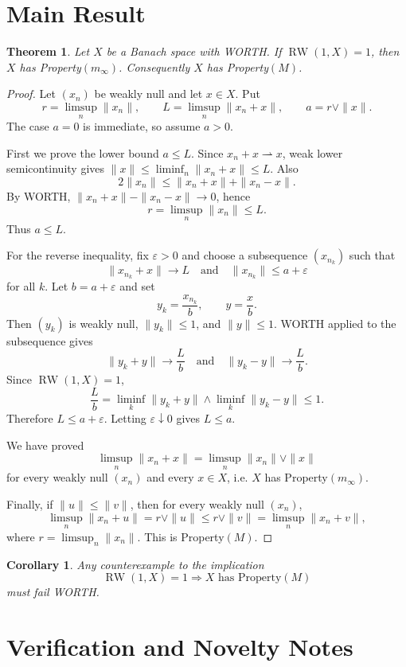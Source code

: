 \documentclass[11pt]{article}
\newtheorem{theorem}{Theorem}
\newtheorem{corollary}{Corollary}
\DeclareMathOperator{\RW}{RW}
\begin{document}
\section*{Main Result}

\begin{theorem}
Let $X$ be a Banach space with WORTH.  If $\RW(1,X)=1$, then $X$ has
Property$(m_\infty)$.  Consequently $X$ has Property$(M)$.
\end{theorem}

\begin{proof}
Let $(x_n)$ be weakly null and let $x\in X$.  Put
\[
 r=\limsup_n\|x_n\|,\qquad
 L=\limsup_n\|x_n+x\|,\qquad
 a=r\vee\|x\|.
\]
The case $a=0$ is immediate, so assume $a>0$.

First we prove the lower bound $a\leq L$.  Since $x_n+x\rightharpoonup x$,
weak lower semicontinuity gives $\|x\|\leq \liminf_n\|x_n+x\|\leq L$.
Also
\[
2\|x_n\|\leq \|x_n+x\|+\|x_n-x\|.
\]
By WORTH, $\|x_n+x\|-\|x_n-x\|\to 0$, hence
\[
r=\limsup_n\|x_n\|\leq L.
\]
Thus $a\leq L$.

For the reverse inequality, fix $\varepsilon>0$ and choose a subsequence
$(x_{n_k})$ such that
\[
\|x_{n_k}+x\|\longrightarrow L
\quad\text{and}\quad
\|x_{n_k}\|\leq a+\varepsilon
\]
for all $k$.  Let $b=a+\varepsilon$ and set
\[
y_k=\frac{x_{n_k}}{b},\qquad y=\frac{x}{b}.
\]
Then $(y_k)$ is weakly null, $\|y_k\|\leq 1$, and $\|y\|\leq 1$.  WORTH
applied to the subsequence gives
\[
\|y_k+y\|\longrightarrow \frac{L}{b}
\quad\text{and}\quad
\|y_k-y\|\longrightarrow \frac{L}{b}.
\]
Since $\RW(1,X)=1$,
\[
\frac{L}{b}
=
\liminf_k\|y_k+y\|\wedge \liminf_k\|y_k-y\|
\leq 1.
\]
Therefore $L\leq a+\varepsilon$.  Letting $\varepsilon\downarrow 0$
gives $L\leq a$.

We have proved
\[
\limsup_n\|x_n+x\|=\limsup_n\|x_n\|\vee\|x\|
\]
for every weakly null $(x_n)$ and every $x\in X$, i.e. $X$ has
Property$(m_\infty)$.

Finally, if $\|u\|\leq\|v\|$, then for every weakly null $(x_n)$,
\[
\limsup_n\|x_n+u\|
=r\vee\|u\|
\leq r\vee\|v\|
=\limsup_n\|x_n+v\|,
\]
where $r=\limsup_n\|x_n\|$.  This is Property$(M)$.
\end{proof}

\begin{corollary}
Any counterexample to the implication
\[
\RW(1,X)=1 \Longrightarrow \text{$X$ has Property$(M)$}
\]
must fail WORTH.
\end{corollary}

\section*{Verification and Novelty Notes}
\end{document}
